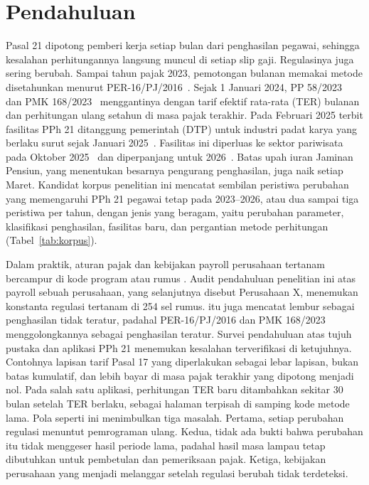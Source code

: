 \section{Pendahuluan}
\label{sec:pendahuluan}

 Pasal 21 dipotong pemberi kerja setiap bulan dari penghasilan pegawai, sehingga kesalahan perhitungannya langsung muncul di setiap slip gaji. Regulasinya juga sering berubah. Sampai tahun pajak 2023, pemotongan bulanan memakai metode disetahunkan menurut PER-16/PJ/2016~\cite{per16_2016}. Sejak 1 Januari 2024, PP 58/2023~\cite{pp58_2023} dan PMK 168/2023~\cite{pmk168_2023} menggantinya dengan tarif efektif rata-rata (TER) bulanan dan perhitungan ulang setahun di masa pajak terakhir. Pada Februari 2025 terbit fasilitas PPh 21 ditanggung pemerintah (DTP) untuk industri padat karya yang berlaku surut sejak Januari 2025~\cite{pmk10_2025}. Fasilitas ini diperluas ke sektor pariwisata pada Oktober 2025~\cite{pmk72_2025} dan diperpanjang untuk 2026~\cite{pmk105_2025}. Batas upah iuran Jaminan Pensiun, yang menentukan besarnya pengurang penghasilan, juga naik setiap Maret. Kandidat korpus penelitian ini mencatat sembilan peristiwa perubahan yang memengaruhi PPh 21 pegawai tetap pada 2023--2026, atau dua sampai tiga peristiwa per tahun, dengan jenis yang beragam, yaitu perubahan parameter, klasifikasi penghasilan, fasilitas baru, dan pergantian metode perhitungan (Tabel~\ref{tab:korpus}).


Dalam praktik, aturan pajak dan kebijakan payroll perusahaan tertanam bercampur di kode program atau rumus . Audit pendahuluan penelitian ini atas  payroll sebuah perusahaan, yang selanjutnya disebut Perusahaan X, menemukan konstanta regulasi tertanam di 254 sel rumus.  itu juga mencatat lembur sebagai penghasilan tidak teratur, padahal PER-16/PJ/2016 dan PMK 168/2023 menggolongkannya sebagai penghasilan teratur. Survei pendahuluan atas tujuh pustaka dan aplikasi PPh 21  menemukan kesalahan terverifikasi di ketujuhnya. Contohnya lapisan tarif Pasal 17 yang diperlakukan sebagai lebar lapisan, bukan batas kumulatif, dan lebih bayar di masa pajak terakhir yang dipotong menjadi nol. Pada salah satu aplikasi, perhitungan TER baru ditambahkan sekitar 30 bulan setelah TER berlaku, sebagai halaman terpisah di samping kode metode lama. Pola seperti ini menimbulkan tiga masalah. Pertama, setiap perubahan regulasi menuntut pemrograman ulang. Kedua, tidak ada bukti bahwa perubahan itu tidak menggeser hasil periode lama, padahal hasil masa lampau tetap dibutuhkan untuk pembetulan dan pemeriksaan pajak. Ketiga, kebijakan perusahaan yang menjadi melanggar setelah regulasi berubah tidak terdeteksi.

